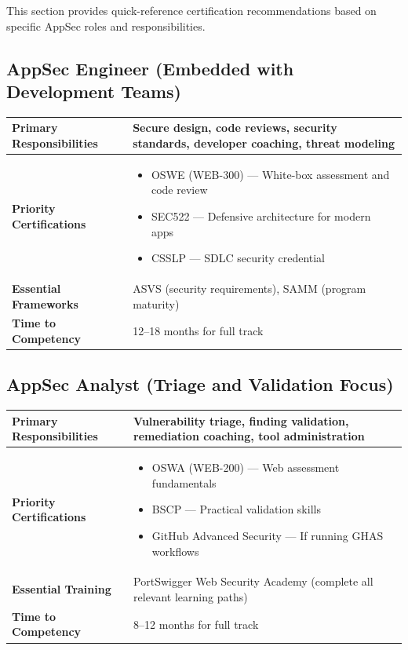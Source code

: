 \documentclass[11pt,letterpaper]{article}
\begin{document}
This section provides quick-reference certification recommendations based on specific AppSec roles and responsibilities.

\subsection{AppSec Engineer (Embedded with Development Teams)}

\begin{table}[H]
\centering
\begin{tabularx}{\textwidth}{l X}
\toprule
\textbf{Primary Responsibilities} & Secure design, code reviews, security standards, developer coaching, threat modeling \\
\midrule
\textbf{Priority Certifications} & \begin{itemize}[nosep,leftmargin=*]
    \item OSWE (WEB-300) --- White-box assessment and code review
    \item SEC522 --- Defensive architecture for modern apps
    \item CSSLP --- SDLC security credential
\end{itemize} \\
\midrule
\textbf{Essential Frameworks} & ASVS (security requirements), SAMM (program maturity) \\
\midrule
\textbf{Time to Competency} & 12--18 months for full track \\
\bottomrule
\end{tabularx}
\end{table}

\subsection{AppSec Analyst (Triage and Validation Focus)}

\begin{table}[H]
\centering
\begin{tabularx}{\textwidth}{l X}
\toprule
\textbf{Primary Responsibilities} & Vulnerability triage, finding validation, remediation coaching, tool administration \\
\midrule
\textbf{Priority Certifications} & \begin{itemize}[nosep,leftmargin=*]
    \item OSWA (WEB-200) --- Web assessment fundamentals
    \item BSCP --- Practical validation skills
    \item GitHub Advanced Security --- If running GHAS workflows
\end{itemize} \\
\midrule
\textbf{Essential Training} & PortSwigger Web Security Academy (complete all relevant learning paths) \\
\midrule
\textbf{Time to Competency} & 8--12 months for full track \\
\bottomrule
\end{tabularx}
\end{table}
\end{document}
